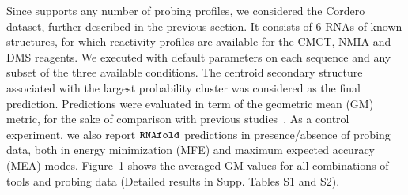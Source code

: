 \documentclass[a4,center,fleqn]{NAR}
\begin{document}
Since \OurTool{} supports any number of probing profiles, we considered the Cordero\etal\cite{Cordero2012a} dataset, further described in the previous section. It consists of 6 RNAs of known structures, for which reactivity profiles are available for the CMCT, NMIA and DMS reagents. We executed \OurTool{} with default parameters on each sequence and any subset of the three available conditions. The centroid secondary structure  associated with the largest probability cluster was considered as the final prediction. Predictions were evaluated in term of the geometric mean (GM) metric, for the sake of comparison with previous studies~\cite{Spasic2017}. As a control experiment, we also report ${\tt RNAfold}$ predictions in presence/absence of probing data, both in energy minimization (MFE) and maximum expected accuracy (MEA) modes. Figure~\ref{cordero1} shows the averaged GM values for all combinations of tools and probing data (Detailed results in Supp. Tables S1 and S2).



\begin{figure}
	{\\}
	
	\caption{}
	\label{cordero1}
\end{figure}
\end{document}

